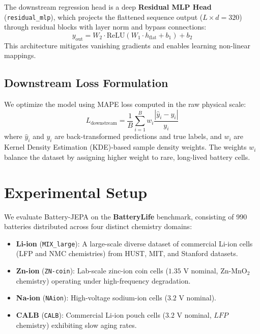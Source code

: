\documentclass[a4paper,fleqn]{cas-dc}
\begin{document}
The downstream regression head is a deep \textbf{Residual MLP Head} (\texttt{residual\_mlp}), which projects the flattened sequence output ($L \times d = 320$) through residual blocks with layer norm and bypass connections:
\begin{equation}
    y_{\text{out}} = W_2 \cdot \text{ReLU}\left(W_1 \cdot h_{\text{flat}} + b_1\right) + b_2
\end{equation}
This architecture mitigates vanishing gradients and enables learning non-linear mappings.

\subsection{Downstream Loss Formulation}
We optimize the model using MAPE loss computed in the raw physical scale:
\begin{equation}
    L_{\text{downstream}} = \frac{1}{B} \sum_{i=1}^B w_i \frac{|\hat{y}_i - y_i|}{y_i}
\end{equation}
where $\hat{y}_i$ and $y_i$ are back-transformed predictions and true labels, and $w_i$ are Kernel Density Estimation (KDE)-based sample density weights. The weights $w_i$ balance the dataset by assigning higher weight to rare, long-lived battery cells.

\section{Experimental Setup}
\label{sec:setup}

We evaluate Battery-JEPA on the \textbf{BatteryLife} benchmark, consisting of 990 batteries distributed across four distinct chemistry domains:
\begin{itemize}
    \item \textbf{Li-ion} (\texttt{MIX\_large}): A large-scale diverse dataset of commercial Li-ion cells (LFP and NMC chemistries) from HUST, MIT, and Stanford datasets.
    \item \textbf{Zn-ion} (\texttt{ZN-coin}): Lab-scale zinc-ion coin cells ($1.35\text{ V}$ nominal, $\text{Zn-MnO}_2$ chemistry) operating under high-frequency degradation.
    \item \textbf{Na-ion} (\texttt{NAion}): High-voltage sodium-ion cells ($3.2\text{ V}$ nominal).
    \item \textbf{CALB} (\texttt{CALB}): Commercial Li-ion pouch cells ($3.2\text{ V}$ nominal, $LFP$ chemistry) exhibiting slow aging rates.
\end{itemize}
\end{document}
